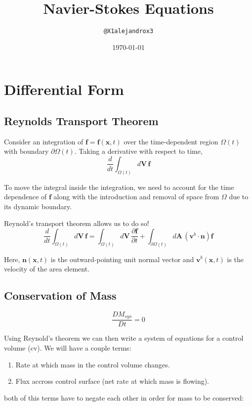 \documentclass[10pt,a4paper,draft]{article}
\begin{document}
\title{Navier-Stokes Equations} 
\author{\texttt{@X1alejandrox3}} 
\date{\today}  
\maketitle

\tableofcontents


\section{Differential Form}

\subsection{Reynolds Transport Theorem}
Consider an integration of $\mathbf{f} = \mathbf{f}(\mathbf{x},t)$ over the time-dependent region $\Omega (t)$ with boundary $\partial \Omega(t)$.
Taking a derivative with respect to time,
$$
\frac{d}{dt} \int_{\Omega (t)} d\mathbf{V} \, \mathbf{f}
$$

To move the integral inside the integration, we need to account for the time dependence of $\mathbf{f}$ along with the introduction and removal of space from $\Omega$ due to its dynamic boundary.


Reynold's transport theorem allows us to do so!
$$
\frac{d}{d t} \int_{\Omega (t)} d\mathbf{V} \, \mathbf{f} 
= \int_{\Omega (t)} d\mathbf{V} \, \frac{\partial \mathbf{f}}{\partial t}
+ \int_{\partial \Omega (t)} d\mathbf{A} \, \left(\mathbf{v}^b \cdot \mathbf{n}\right) \mathbf{f}
$$

Here, $\mathbf{n}(\mathbf{x},t)$ is the outward-pointing unit normal vector and $\mathbf{v}^b(\mathbf{x},t)$ is the velocity of the area element.


\subsection{Conservation of Mass}
$$
\frac{D M_{sys}}{D t} = 0
$$

Using Reynold's theorem we can then write a system of equations for a control volume (cv).
We will have a couple terms: 
\begin{enumerate}
\item Rate at which mass in the control volume changes.
\item Flux accross control surface (net rate at which mass is flowing).
\end{enumerate}
both of this terms have to negate each other in order for mass to be conserved:
\end{document}
